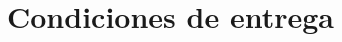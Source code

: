 \chapter{Condiciones de entrega}
\ifpdf
    \graphicspath{{Chapter5/Chapter5Figs/PNG/}{Chapter5/Chapter5Figs/PDF/}{Chapter5/ChapterFigs/}}
\else
    \graphicspath{{Chapter5/Chapter5Figs/EPS/}{Chapter5/Chapter5Figs/}}
\fi



